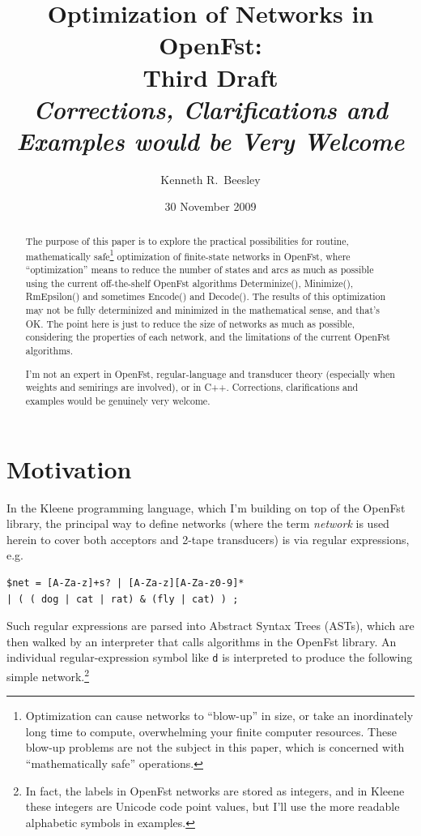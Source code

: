 \documentclass[letterpaper,12pt]{article}
\title{Optimization of Networks in OpenFst:\\
Third Draft\\
\emph{Corrections, Clarifications and Examples would be Very Welcome}}
\author{Kenneth R.~Beesley}
\date{30 November 2009}
\begin{document}
\maketitle

\begin{abstract}
The purpose of this paper is to explore the practical possibilities for routine,
mathematically safe\footnote{Optimization can cause networks to ``blow-up'' in
size, or take an inordinately long time to compute, overwhelming your finite
computer resources.  These blow-up problems are not the subject in this paper,
which is concerned with ``mathematically safe'' operations.}
optimization of finite-state
networks in OpenFst, where ``optimization'' means to reduce the number of states and
arcs as much as possible using the current off-the-shelf OpenFst algorithms Determinize(),
Minimize(), RmEpsilon() and sometimes Encode() and Decode().  The results of this optimization may not be fully
determinized and minimized in the mathematical sense, and that's
OK. The point here is just to reduce the size of networks as much as
possible, considering the properties of each network, and the
limitations of the current OpenFst algorithms. 

I'm not an
expert in OpenFst, regular-language and transducer theory (especially when weights
and semirings are involved), or in C++.  Corrections, clarifications and examples
would be genuinely very welcome.
\end{abstract}

\section{Motivation}

In the Kleene programming language, which I'm building on top of the OpenFst
library, the principal way to define networks (where the term
\emph{network} is used herein to cover
both acceptors and 2-tape transducers) is via regular expressions, e.g.

\begin{Verbatim}[fontsize=\footnotesize]
$net = [A-Za-z]+s? | [A-Za-z][A-Za-z0-9]* 
| ( ( dog | cat | rat) & (fly | cat) ) ;
\end{Verbatim}

\noindent 
Such regular expressions are parsed into Abstract Syntax Trees
(ASTs),
which are then walked by an interpreter that calls algorithms in
the OpenFst library.  An individual regular-expression symbol like
\texttt{d} is interpreted to produce the following simple network.\footnote{In fact,
the labels in OpenFst networks are stored as integers, and in Kleene these integers
are Unicode code point values, but I'll use the more readable alphabetic symbols in
examples.}
\end{document}
